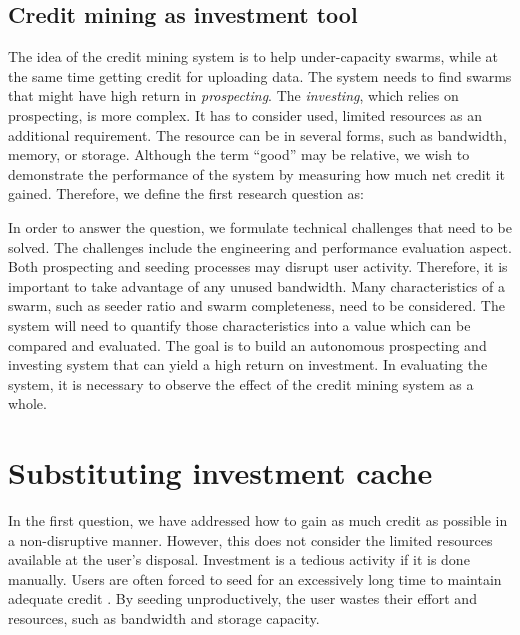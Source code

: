 \subsection{Credit mining as investment tool}

The idea of the credit mining system is to help under-capacity swarms, while at the same time getting credit for uploading data. The system needs to find swarms that might have high return in \textit{prospecting}. The \textit{investing}, which relies on prospecting, is more complex. It has to consider used, limited resources as an additional requirement. The resource can be in several forms, such as bandwidth, memory, or storage. Although the term ``good'' may be relative, we wish to demonstrate the performance of the system by measuring how much net credit it gained. Therefore, we define the first research question as:

	
In order to answer the question, we formulate technical challenges that need to be solved. The challenges include the engineering and performance evaluation aspect. Both prospecting and seeding processes may disrupt user activity. Therefore, it is important to take advantage of any unused bandwidth. Many characteristics of a swarm, such as seeder ratio and swarm completeness, need to be considered. The system will need to quantify those characteristics into a value which can be compared and evaluated. The goal is to build an autonomous prospecting and investing system that can yield a high return on investment. In evaluating the system, it is necessary to observe the effect of the credit mining system as a whole.

\section{Substituting investment cache}
In the first question, we have addressed how to gain as much credit as possible in a non-disruptive manner. However, this does not consider the limited resources available at the user's disposal. Investment is a tedious activity if it is done manually. Users are often forced to seed for an excessively long time to maintain adequate credit \cite{2013:survivepriv:jia}. By seeding unproductively, the user wastes their effort and resources, such as bandwidth and storage capacity. 

